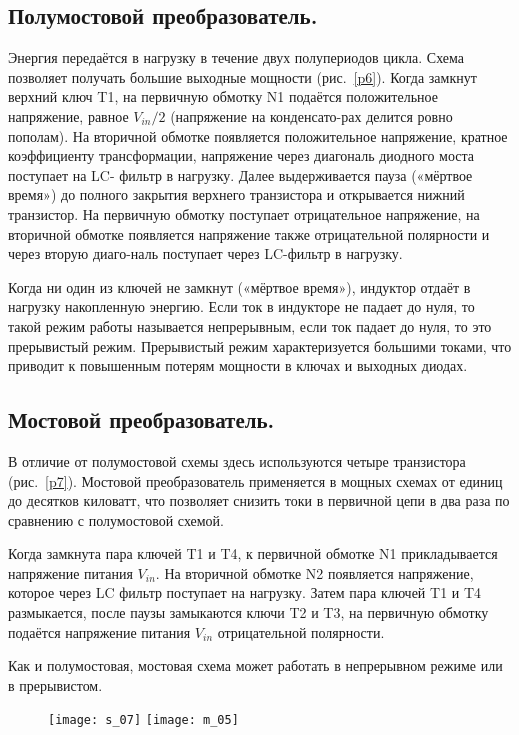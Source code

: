 \subsection{Полумостовой преобразователь.}

	Энергия передаётся в нагрузку в течение двух полупериодов цикла. Схема позволяет получать большие выходные мощности (рис.~\ref{p6}). Когда замкнут верхний ключ T1, на первичную обмотку N1 подаётся положительное напряжение, равное $ V_{in}/2 $ (напряжение на конденсато-рах делится ровно пополам). На вторичной обмотке появляется положительное напряжение, кратное коэффициенту трансформации, напряжение через диагональ диодного моста поступает на LC- фильтр в нагрузку. Далее выдерживается пауза («мёртвое время») до полного закрытия верхнего транзистора и открывается нижний транзистор. На первичную обмотку поступает отрицательное напряжение, на вторичной обмотке появляется напряжение также отрицательной полярности и через вторую диаго-наль поступает через LC-фильтр в нагрузку. 

	Когда ни один из ключей не замкнут («мёртвое время»), индуктор отдаёт в нагрузку накопленную энергию. Если ток в индукторе не падает до нуля, то такой режим работы называется непрерывным, если ток падает до нуля, то это прерывистый режим. Прерывистый режим характеризуется большими токами, что приводит к повышенным потерям мощности в ключах и выходных диодах.
	
\subsection{Мостовой преобразователь.}

	В отличие от полумостовой схемы здесь используются четыре 
транзистора (рис.~\ref{p7}). Мостовой преобразователь применяется в мощных схемах от единиц до десятков киловатт, что позволяет снизить токи в первичной цепи в два раза по сравнению с полумостовой схемой.

	Когда замкнута пара ключей T1 и T4, к первичной обмотке N1 прикладывается напряжение питания $ V_{in} $. На вторичной обмотке N2 появляется напряжение, которое через LC фильтр поступает 
на нагрузку. Затем пара ключей T1 и T4 размыкается, после паузы замыкаются ключи T2 и T3, на первичную обмотку подаётся напряжение питания $ V_{in} $ отрицательной полярности. 

	Как и полумостовая, мостовая схема может 
работать в непрерывном режиме или в прерывистом.

\begin{figure}[ht]
	\texttt{[image: s\_07]} \hfill
	\texttt{[image: m\_05]}
	\parbox{.45\textwidth}{\caption{}\label{p7}} \hfill
	\parbox{.45\textwidth}{\caption{}\label{p8}}
\end{figure}

